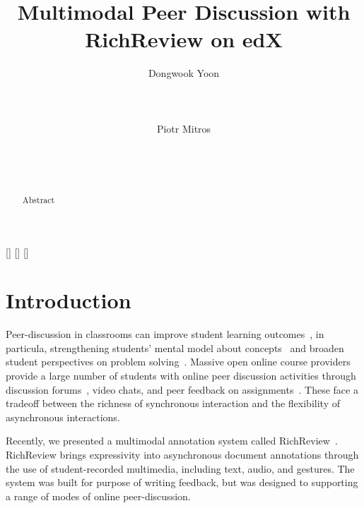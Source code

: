 \documentclass{sigchi}
\begin{document}
\title{Multimodal Peer Discussion with RichReview on edX}

\author{
  \alignauthor Dongwook Yoon\\
    \\
    \\
    \\
  \alignauthor Piotr Mitros\\
    \\
    \\
    \\
}

\maketitle

\begin{abstract}
Abstract
\end{abstract}


[] 
[] 
[] 

\section{Introduction}

Peer-discussion in classrooms can improve student learning outcomes~\cite{chi2014icap}, in particula, strengthening students’ mental model about concepts~\cite{nicol2003peer} and broaden student perspectives on problem solving~\cite{smith2009peer}.
Massive open online course providers provide a large number of students with online peer discussion activities through discussion forums~\cite{mitros-6002x}, video chats, and peer feedback on assignments~\cite{mitros-linc}. These face a tradeoff between the richness of synchronous interaction and the flexibility of asynchronous interactions.

Recently, we presented a multimodal annotation system called RichReview~\cite{yoon2014richreview}.
RichReview brings expressivity into asynchronous document annotations through the use of student-recorded multimedia, including text, audio, and gestures.
The system was built for purpose of writing feedback, but was designed to supporting a range of modes of online peer-discussion.
\end{document}
